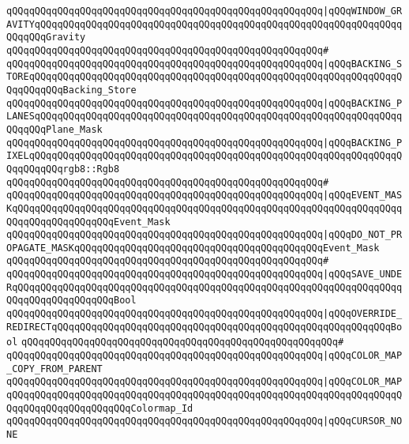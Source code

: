 \verb|qQQqqQQqqQQqqQQqqQQqqQQqqQQqqQQqqQQqqQQqqQQqqQQqqQQqqQQq|\verb#|qQQqWINDOW_GRAVITYqQQqqQQqqQQqqQQqqQQqqQQqqQQqqQQqqQQqqQQqqQQqqQQqqQQqqQQqqQQqqQQqqQQqqQQqGravity#\newline
\verb|qQQqqQQqqQQqqQQqqQQqqQQqqQQqqQQqqQQqqQQqqQQqqQQqqQQqqQQq#|\newline
\verb|qQQqqQQqqQQqqQQqqQQqqQQqqQQqqQQqqQQqqQQqqQQqqQQqqQQqqQQq|\verb#|qQQqBACKING_STOREqQQqqQQqqQQqqQQqqQQqqQQqqQQqqQQqqQQqqQQqqQQqqQQqqQQqqQQqqQQqqQQqqQQqqQQqqQQqBacking_Store#\newline
\verb|qQQqqQQqqQQqqQQqqQQqqQQqqQQqqQQqqQQqqQQqqQQqqQQqqQQqqQQq|\verb#|qQQqBACKING_PLANESqQQqqQQqqQQqqQQqqQQqqQQqqQQqqQQqqQQqqQQqqQQqqQQqqQQqqQQqqQQqqQQqqQQqqQQqPlane_Mask#\newline
\verb|qQQqqQQqqQQqqQQqqQQqqQQqqQQqqQQqqQQqqQQqqQQqqQQqqQQqqQQq|\verb#|qQQqBACKING_PIXELqQQqqQQqqQQqqQQqqQQqqQQqqQQqqQQqqQQqqQQqqQQqqQQqqQQqqQQqqQQqqQQqqQQqqQQqqQQqrgb8::Rgb8#\newline
\verb|qQQqqQQqqQQqqQQqqQQqqQQqqQQqqQQqqQQqqQQqqQQqqQQqqQQqqQQq#|\newline
\verb|qQQqqQQqqQQqqQQqqQQqqQQqqQQqqQQqqQQqqQQqqQQqqQQqqQQqqQQq|\verb#|qQQqEVENT_MASKqQQqqQQqqQQqqQQqqQQqqQQqqQQqqQQqqQQqqQQqqQQqqQQqqQQqqQQqqQQqqQQqqQQqqQQqqQQqqQQqqQQqqQQqEvent_Mask#\newline
\verb|qQQqqQQqqQQqqQQqqQQqqQQqqQQqqQQqqQQqqQQqqQQqqQQqqQQqqQQq|\verb#|qQQqDO_NOT_PROPAGATE_MASKqQQqqQQqqQQqqQQqqQQqqQQqqQQqqQQqqQQqqQQqqQQqEvent_Mask#\newline
\verb|qQQqqQQqqQQqqQQqqQQqqQQqqQQqqQQqqQQqqQQqqQQqqQQqqQQqqQQq#|\newline
\verb|qQQqqQQqqQQqqQQqqQQqqQQqqQQqqQQqqQQqqQQqqQQqqQQqqQQqqQQq|\verb#|qQQqSAVE_UNDERqQQqqQQqqQQqqQQqqQQqqQQqqQQqqQQqqQQqqQQqqQQqqQQqqQQqqQQqqQQqqQQqqQQqqQQqqQQqqQQqqQQqqQQqBool#\newline
\verb|qQQqqQQqqQQqqQQqqQQqqQQqqQQqqQQqqQQqqQQqqQQqqQQqqQQqqQQq|\verb#|qQQqOVERRIDE_REDIRECTqQQqqQQqqQQqqQQqqQQqqQQqqQQqqQQqqQQqqQQqqQQqqQQqqQQqqQQqqQQqBool#\newline
\verb|qQQqqQQqqQQqqQQqqQQqqQQqqQQqqQQqqQQqqQQqqQQqqQQqqQQqqQQq#|\newline
\verb|qQQqqQQqqQQqqQQqqQQqqQQqqQQqqQQqqQQqqQQqqQQqqQQqqQQqqQQq|\verb#|qQQqCOLOR_MAP_COPY_FROM_PARENT#\newline
\verb|qQQqqQQqqQQqqQQqqQQqqQQqqQQqqQQqqQQqqQQqqQQqqQQqqQQqqQQq|\verb#|qQQqCOLOR_MAPqQQqqQQqqQQqqQQqqQQqqQQqqQQqqQQqqQQqqQQqqQQqqQQqqQQqqQQqqQQqqQQqqQQqqQQqqQQqqQQqqQQqqQQqqQQqColormap_Id#\newline
\verb|qQQqqQQqqQQqqQQqqQQqqQQqqQQqqQQqqQQqqQQqqQQqqQQqqQQqqQQq|\verb#|qQQqCURSOR_NONE#\newline
